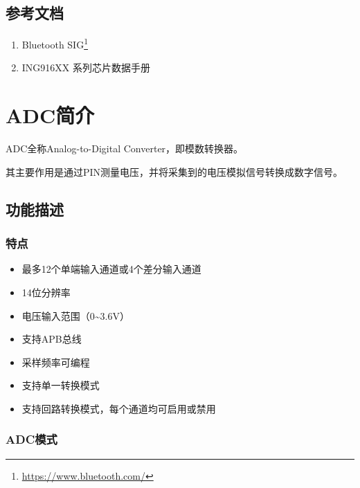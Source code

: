 \documentclass[
  12pt,
]{book}
\providecommand{\tightlist}{%
  \setlength{\itemsep}{0pt}\setlength{\parskip}{0pt}}
\begin{document}
\hypertarget{ux53c2ux8003ux6587ux6863}{%
\section{参考文档}\label{ux53c2ux8003ux6587ux6863}}

\begin{enumerate}
\def\labelenumi{\arabic{enumi}.}
\tightlist
\item
  Bluetooth SIG\footnote{\url{https://www.bluetooth.com/}}
\item
  ING916XX 系列芯片数据手册
\end{enumerate}

\hypertarget{ch-adc}{%
\chapter{ADC简介}\label{ch-adc}}

ADC全称Analog-to-Digital Converter，即模数转换器。

其主要作用是通过PIN测量电压，并将采集到的电压模拟信号转换成数字信号。

\hypertarget{ux529fux80fdux63cfux8ff0}{%
\section{功能描述}\label{ux529fux80fdux63cfux8ff0}}

\hypertarget{ux7279ux70b9}{%
\subsection{特点}\label{ux7279ux70b9}}

\begin{itemize}
\item
  最多12个单端输入通道或4个差分输入通道
\item
  14位分辨率
\item
  电压输入范围（0\textasciitilde3.6V）
\item
  支持APB总线
\item
  采样频率可编程
\item
  支持单一转换模式
\item
  支持回路转换模式，每个通道均可启用或禁用
\end{itemize}

\hypertarget{adcux6a21ux5f0f}{%
\subsection{ADC模式}\label{adcux6a21ux5f0f}}
\end{document}
